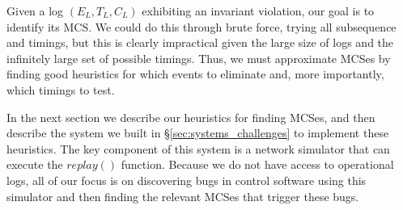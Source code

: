 Given a log $(E_L, T_L, C_L)$ exhibiting an invariant violation,
our goal is to identify its MCS. We could do this through brute force, trying
all subsequence and timings, but this is clearly impractical given the large size of logs and the
infinitely large set of possible timings. Thus, we must approximate MCSes by finding good heuristics
for which events to eliminate and, more importantly, which timings to test.

In the next section we describe our heuristics for finding MCSes, and then describe the system we built in \S\ref{sec:systems_challenges} to implement these heuristics.
The key component of this system is a network simulator that can execute the $replay()$ function.
Because we do not have access to operational logs, all of our focus is on
discovering bugs in control software using this
simulator and then finding the relevant MCSes that trigger these bugs.
